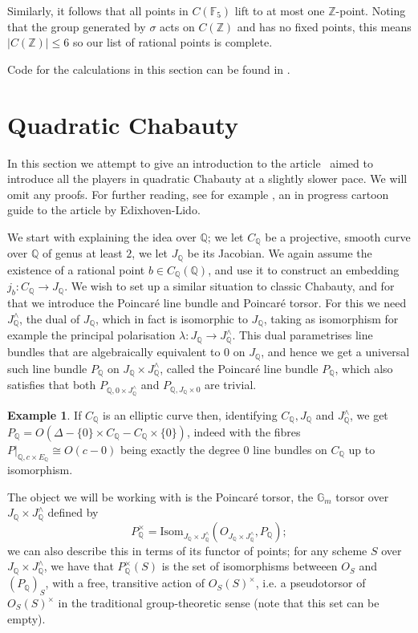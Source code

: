\documentclass[12pt]{article}
\newcommand{\Z}{\mathbb{Z}}
\renewcommand{\G}{\mathbb{G}}
\newcommand{\Q}{\mathbb{Q}}
\newcommand{\F}{\mathbb{F}}
\theoremstyle{plain}
\theoremstyle{definition}
\newtheorem{exmp}[thm]{Example} %
\theoremstyle{remark}
\begin{document}
Similarly, it follows that all points in $C(\F_5)$ lift to at most one $\Z$-point. Noting that the group generated by $\sigma$ acts on $C(\Z)$ and has no fixed points, this means $|C(\Z)| \leq 6$ so our list of rational points is complete.

Code for the calculations in this section can be found in \cite{spelier2020}.

\section{Quadratic Chabauty}
\label{section:quadratic}
In this section we attempt to give an introduction to the article~\cite{edixhoven20} aimed to introduce all the players in quadratic Chabauty at a slightly slower pace. We will omit any proofs. For further reading, see for example \cite{hashimoto20}, an in progress cartoon guide to the article by Edixhoven-Lido.

We start with explaining the idea over $\Q$; we let $C_\Q$ be a projective, smooth curve over $\Q$ of genus at least $2$, we let $J_\Q$ be its Jacobian. We again assume the existence of a rational point $b \in C_\Q(\Q)$, and use it to construct an embedding $j_b : C_\Q \to J_\Q$. We wish to set up a similar situation to classic Chabauty, and for that we introduce the Poincar\'e line bundle and Poincar\'e torsor. For this we need $J_\Q^\wedge$, the dual of $J_\Q$, which in fact is isomorphic to $J_\Q$, taking as isomorphism for example the principal polarisation $\lambda: J_\Q \to J_\Q^\wedge$. This dual parametrises line bundles that are algebraically equivalent to $0$ on $J_\Q$, and hence we get a universal such line bundle $P_\Q$ on $J_\Q \times J_\Q^\wedge$, called the Poincar\'e line bundle $P_\Q$, which also satisfies that both $P_{\Q,0\times J_\Q^\wedge}$ and $P_{\Q,J_\Q \times 0}$ are trivial.

\begin{exmp}
If $C_\Q$ is an elliptic curve then, identifying $C_\Q,J_\Q$ and $J_\Q^{\wedge}$, we get $P_\Q = O(\Delta-\{0\} \times C_\Q - C_\Q \times \{0\})$, indeed with the fibres $P|_{\Q,c \times E_\Q} \cong O(c-0)$ being exactly the degree $0$ line bundles on $C_\Q$ up to isomorphism.
\end{exmp}

The object we will be working with is the Poincar\'e torsor, the $\G_m$ torsor over $J_\Q \times J_\Q^\wedge$ defined by \[
P_\Q^\times = \text{Isom}_{J_\Q \times J^\wedge_\Q}(O_{J_\Q \times J^\wedge_\Q},P_\Q);
\] 
we can also describe this in terms of its functor of points; for any scheme $S$ over $J_\Q \times J^\wedge_\Q$, we have that $P^\times_\Q(S)$ is the set of isomorphisms betweeen $O_S$ and $(P_\Q)_S$, with a free, transitive action of $O_S(S)^\times$, i.e. a pseudotorsor of $O_S(S)^\times$ in the traditional group-theoretic sense (note that this set can be empty).
\end{document}
